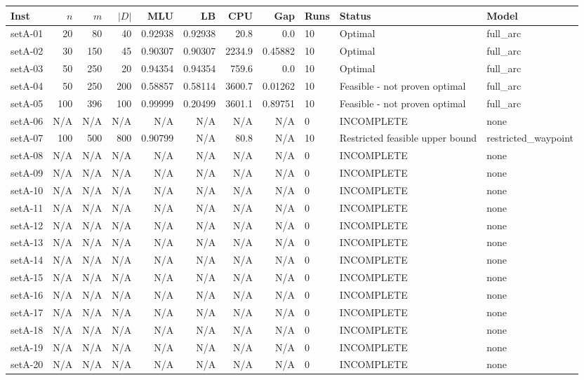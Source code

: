 \begin{tabular}{lrrrrrrrlll}
\toprule
Inst & $n$ & $m$ & $|D|$ & MLU & LB & CPU & Gap & Runs & Status & Model \\ \midrule
setA-01 & 20 & 80 & 40 & 0.92938 & 0.92938 & 20.8 & 0.0 & 10 & Optimal & full\_arc \\
setA-02 & 30 & 150 & 45 & 0.90307 & 0.90307 & 2234.9 & 0.45882 & 10 & Optimal & full\_arc \\
setA-03 & 50 & 250 & 20 & 0.94354 & 0.94354 & 759.6 & 0.0 & 10 & Optimal & full\_arc \\
setA-04 & 50 & 250 & 200 & 0.58857 & 0.58114 & 3600.7 & 0.01262 & 10 & Feasible - not proven optimal & full\_arc \\
setA-05 & 100 & 396 & 100 & 0.99999 & 0.20499 & 3601.1 & 0.89751 & 10 & Feasible - not proven optimal & full\_arc \\
setA-06 & N/A & N/A & N/A & N/A & N/A & N/A & N/A & 0 & INCOMPLETE & none \\
setA-07 & 100 & 500 & 800 & 0.90799 & N/A & 80.8 & N/A & 10 & Restricted feasible upper bound & restricted\_waypoint \\
setA-08 & N/A & N/A & N/A & N/A & N/A & N/A & N/A & 0 & INCOMPLETE & none \\
setA-09 & N/A & N/A & N/A & N/A & N/A & N/A & N/A & 0 & INCOMPLETE & none \\
setA-10 & N/A & N/A & N/A & N/A & N/A & N/A & N/A & 0 & INCOMPLETE & none \\
setA-11 & N/A & N/A & N/A & N/A & N/A & N/A & N/A & 0 & INCOMPLETE & none \\
setA-12 & N/A & N/A & N/A & N/A & N/A & N/A & N/A & 0 & INCOMPLETE & none \\
setA-13 & N/A & N/A & N/A & N/A & N/A & N/A & N/A & 0 & INCOMPLETE & none \\
setA-14 & N/A & N/A & N/A & N/A & N/A & N/A & N/A & 0 & INCOMPLETE & none \\
setA-15 & N/A & N/A & N/A & N/A & N/A & N/A & N/A & 0 & INCOMPLETE & none \\
setA-16 & N/A & N/A & N/A & N/A & N/A & N/A & N/A & 0 & INCOMPLETE & none \\
setA-17 & N/A & N/A & N/A & N/A & N/A & N/A & N/A & 0 & INCOMPLETE & none \\
setA-18 & N/A & N/A & N/A & N/A & N/A & N/A & N/A & 0 & INCOMPLETE & none \\
setA-19 & N/A & N/A & N/A & N/A & N/A & N/A & N/A & 0 & INCOMPLETE & none \\
setA-20 & N/A & N/A & N/A & N/A & N/A & N/A & N/A & 0 & INCOMPLETE & none \\
\bottomrule
\end{tabular}
